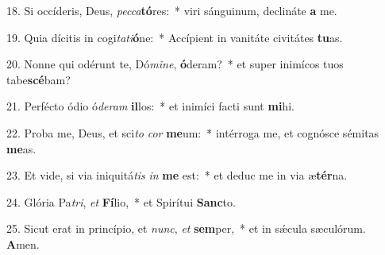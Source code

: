 18. Si occíderis, Deus, \textit{pec}\textit{ca}\textbf{tó}res:~*  viri sánguinum, declináte \textbf{a} me.\

19. Quia dícitis in cogi\textit{ta}\textit{ti}\textbf{ó}ne:~*  Accípient in vanitáte civitátes \textbf{tu}as.\

20. Nonne qui odérunt te, Dó\textit{mi}\textit{ne}, \textbf{ó}deram?~*  et super inimícos tuos tabe\textbf{scé}bam?\

21. Perfécto ódio ó\textit{de}\textit{ram} \textbf{il}los:~*  et inimíci facti sunt \textbf{mi}hi.\

22. Proba me, Deus, et sci\textit{to} \textit{cor} \textbf{me}um:~*  intérroga me, et cognósce sémitas \textbf{me}as.\

23. Et vide, si via iniquitá\textit{tis} \textit{in} \textbf{me} est:~*  et deduc me in via æ\textbf{tér}na.\

24. Glória Pa\textit{tri}, \textit{et} \textbf{Fí}lio,~*  et Spirítui \textbf{Sanc}to.\

25. Sicut erat in princípio, et \textit{nunc}, \textit{et} \textbf{sem}per,~*  et in sǽcula sæculórum. \textbf{A}men.\

